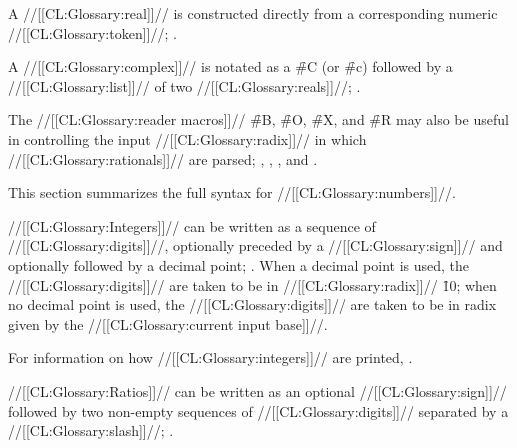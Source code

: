 
\endsubsubsubsection%

\endsubsubsection%

\endsubsection%

 

A //[[CL:Glossary:real]]// is constructed directly from a corresponding numeric //[[CL:Glossary:token]]//; \seefigure\SyntaxForNumericTokens.

A //[[CL:Glossary:complex]]// is notated as a \f{\#C} (or \f{\#c}) followed by a //[[CL:Glossary:list]]// of two //[[CL:Glossary:reals]]//; \seesection\SharpsignC.

The //[[CL:Glossary:reader macros]]// \f{\#B}, \f{\#O}, \f{\#X}, and \f{\#R} may also be useful in controlling the input //[[CL:Glossary:radix]]// in which //[[CL:Glossary:rationals]]// are parsed;
 \seesection\SharpsignB,
     \secref\SharpsignO,
     \secref\SharpsignX,
 and \secref\SharpsignR.

This section summarizes the full syntax for //[[CL:Glossary:numbers]]//.


 

//[[CL:Glossary:Integers]]// can be written as a sequence of //[[CL:Glossary:digits]]//,  optionally preceded by a //[[CL:Glossary:sign]]// and optionally followed by a decimal point; \seefigure\SyntaxForNumericTokens. When a decimal point is used, the //[[CL:Glossary:digits]]// are taken to be in //[[CL:Glossary:radix]]// \f{10}; when no decimal point is used, the //[[CL:Glossary:digits]]// are taken to be in radix given by the //[[CL:Glossary:current input base]]//.

For information on how //[[CL:Glossary:integers]]// are printed, \seesection\PrintingIntegers.

\endsubsubsubsection%

 

//[[CL:Glossary:Ratios]]// can be written as an optional //[[CL:Glossary:sign]]// followed by two non-empty sequences of //[[CL:Glossary:digits]]// separated by a //[[CL:Glossary:slash]]//; \seefigure\SyntaxForNumericTokens.


